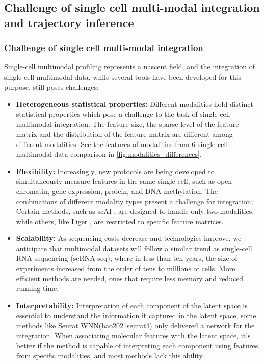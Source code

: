 \subsection{Challenge of single cell multi-modal integration and trajectory inference}
\label{background:sec2:challenge}

\subsubsection{Challenge of single cell multi-modal integration}
\label{background:sec2:challenge_integration}
Single-cell multimodal profiling represents a nascent field, and the integration of single-cell multimodal data, while several tools have been developed for this purpose, still poses challenges:

\begin{itemize}
	\item \textbf{Heterogeneous statistical properties:}
	 Different modalities hold distinct statistical properties which pose a challenge to the task of single cell mulitmodal integration. The feature size, the sparse level of the feature matrix and the distribution of the feature matrix are different among different modalities. See the features of modalities from 6 single-cell multimodal data comparison in \ref{fig:modalities_differences}.

	\item \textbf{Flexibility:}
	Increasingly, new protocols are being developed to simultaneously measure features in the same single cell, such as open chromatin, gene expression, protein, and DNA methylation. The combinations of different modality types present a challenge for integration; Certain methods, such as scAI \cite{jin2020scai}, are designed to handle only two modalities, while others, like Liger \citep{kriebel2022uinmf}, are restricted to specific feature matrices.

	\item \textbf{Scalability:} 
	As sequencing costs decrease and technologies improve, we anticipate that multimodal datasets will follow a similar trend as single-cell RNA sequencing (scRNA-seq), where in less than ten years, the size of experiments increased from the order of tens to millions of cells\citep{svensson2018exponential}. More efficient methods are needed, ones that require less memory and reduced running time.

	\item \textbf{Interpretability:}
	Interpretation of each component of the latent space is essential to understand the information it captured in the latent space, some methods like Seurat WNN(hao2021seurat4) only delivered a network for the integration. When associating molecular features with the latent space, it's better if the method is capable of interpreting each component using features from specific modalities, and most methods lack this ability.


\end{itemize}
